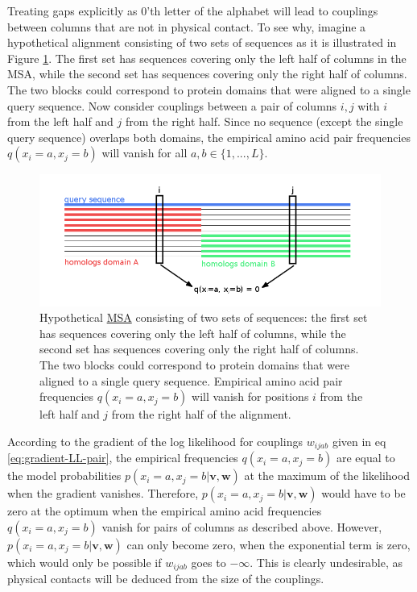 \documentclass[11pt,a4paper,twoside]{book}
\newcommand{\eq}{\!=\!}
\renewcommand{\v}{\mathbf{v}}
\newcommand{\w}{\mathbf{w}}
\newcommand{\wijab}{w_{ijab}}
\theoremstyle{definition}
\theoremstyle{definition}
\theoremstyle{remark}
\begin{document}
Treating gaps explicitly as 0'th letter of the alphabet will lead to
couplings between columns that are not in physical contact. To see why,
imagine a hypothetical alignment consisting of two sets of sequences as
it is illustrated in Figure \ref{fig:gap-treatment}. The first set has
sequences covering only the left half of columns in the MSA, while the
second set has sequences covering only the right half of columns. The
two blocks could correspond to protein domains that were aligned to a
single query sequence. Now consider couplings between a pair of columns
\(i, j\) with \(i\) from the left half and \(j\) from the right half.
Since no sequence (except the single query sequence) overlaps both
domains, the empirical amino acid pair frequencies
\(q(x_i = a, x_j = b)\) will vanish for all \(a, b \in \{1,... , L\}\).










\begin{figure}

{\centering \includegraphics[width=1\linewidth]{img/gap_treatment} 

}

\caption{Hypothetical \protect\hyperlink{abbrev}{MSA}
consisting of two sets of sequences: the first set has sequences
covering only the left half of columns, while the second set has
sequences covering only the right half of columns. The two blocks could
correspond to protein domains that were aligned to a single query
sequence. Empirical amino acid pair frequencies
\(q(x_i \eq a, x_j \eq b)\) will vanish for positions \(i\) from the
left half and \(j\) from the right half of the alignment.}\label{fig:gap-treatment}
\end{figure}

According to the gradient of the log likelihood for couplings \(\wijab\)
given in eq \eqref{eq:gradient-LL-pair}, the empirical frequencies
\(q(x_{i} \eq a, x_{j} \eq b)\) are equal to the model probabilities
\(p(x_i \eq a, x_j \eq b | \v,\w)\) at the maximum of the likelihood
when the gradient vanishes. Therefore,
\(p(x_i \eq a, x_j \eq b | \v, \w)\) would have to be zero at the
optimum when the empirical amino acid frequencies
\(q(x_i \eq a, x_j \eq b)\) vanish for pairs of columns as described
above. However, \(p(x_i \eq a, x_j \eq b | \v, \w)\) can only become
zero, when the exponential term is zero, which would only be possible if
\(\wijab\) goes to \(−\infty\). This is clearly undesirable, as physical
contacts will be deduced from the size of the couplings.
\end{document}
